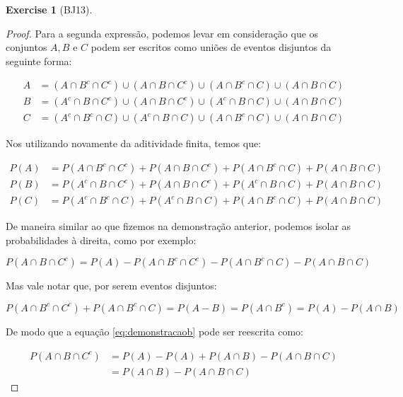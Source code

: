 \documentclass[
]{article}
\theoremstyle{definition}
\theoremstyle{definition}
\theoremstyle{definition}
\newtheorem{exercise}{Exercise}[section]
\theoremstyle{definition}
\theoremstyle{remark}
\begin{document}
\begin{exercise}[BJ13]
\begin{proof}
Para a segunda expressão, podemos levar em consideração que os conjuntos \(A,B \text{ e } C\) podem ser escritos como uniões de eventos disjuntos da seguinte forma:

\begin{align*}
A &= (A \cap B^{c} \cap C^{c}) \cup (A \cap B \cap C^{c}) \cup (A \cap B^{c} \cap C) \cup (A \cap B \cap C) \\
B &= (A^{c} \cap B \cap C^{c}) \cup (A \cap B \cap C^{c}) \cup (A^{c} \cap B \cap C) \cup (A \cap B \cap C) \\
C &= (A^{c} \cap B^{c} \cap C) \cup (A^{c} \cap B \cap C) \cup (A \cap B^{c} \cap C) \cup (A \cap B \cap C)
\end{align*}

Nos utilizando novamente da aditividade finita, temos que:

\begin{align*}
P(A) &= P(A \cap B^{c} \cap C^{c}) + P(A \cap B \cap C^{c}) + P(A \cap B^{c} \cap C) + P(A \cap B \cap C) \\
P(B) &= P(A^{c} \cap B \cap C^{c}) + P(A \cap B \cap C^{c}) + P(A^{c} \cap B \cap C) + P(A \cap B \cap C) \\
P(C) &= P(A^{c} \cap B^{c} \cap C) + P(A^{c} \cap B \cap C) + P(A \cap B^{c} \cap C) + P(A \cap B \cap C)
\end{align*}

De maneira similar ao que fizemos na demonstração anterior, podemos isolar as probabilidades à direita, como por exemplo:

\begin{equation}
P(A \cap B \cap C^{c}) = P(A) - P(A \cap B^{c} \cap C^{c}) - P(A \cap B^{c} \cap C) - P(A \cap B \cap C)
\label{eq:demonstracaob}
\end{equation}

Mas vale notar que, por serem eventos disjuntos:

\begin{equation*}
P(A \cap B^{c} \cap C^{c}) + P(A \cap B^{c} \cap C) = P(A - B) = P(A \cap B^{c}) = P(A) - P(A \cap B)
\end{equation*}

De modo que a equação \eqref{eq:demonstracaob} pode ser reescrita como:

\begin{align*}
P(A \cap B \cap C^{c}) &= P(A) - P(A) + P(A \cap B) - P(A \cap B \cap C) \\
&= P(A \cap B) - P(A \cap B \cap C)
\end{align*}


\end{proof}
\end{exercise}
\end{document}
